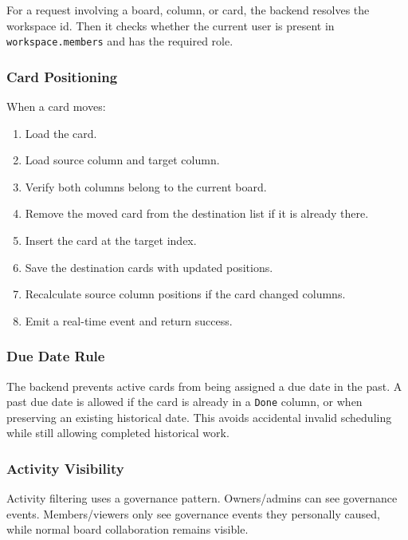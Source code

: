 \documentclass[
]{article}
\providecommand{\tightlist}{%
  \setlength{\itemsep}{0pt}\setlength{\parskip}{0pt}}
\begin{document}
For a request involving a board, column, or card, the backend resolves
the workspace id. Then it checks whether the current user is present in
\texttt{workspace.members} and has the required role.

\subsubsection{Card Positioning}\label{card-positioning}

When a card moves:

\begin{enumerate}
\def\labelenumi{\arabic{enumi}.}
\tightlist
\item
  Load the card.
\item
  Load source column and target column.
\item
  Verify both columns belong to the current board.
\item
  Remove the moved card from the destination list if it is already
  there.
\item
  Insert the card at the target index.
\item
  Save the destination cards with updated positions.
\item
  Recalculate source column positions if the card changed columns.
\item
  Emit a real-time event and return success.
\end{enumerate}

\subsubsection{Due Date Rule}\label{due-date-rule}

The backend prevents active cards from being assigned a due date in the
past. A past due date is allowed if the card is already in a
\texttt{Done} column, or when preserving an existing historical date.
This avoids accidental invalid scheduling while still allowing completed
historical work.

\subsubsection{Activity Visibility}\label{activity-visibility}

Activity filtering uses a governance pattern. Owners/admins can see
governance events. Members/viewers only see governance events they
personally caused, while normal board collaboration remains visible.
\end{document}
